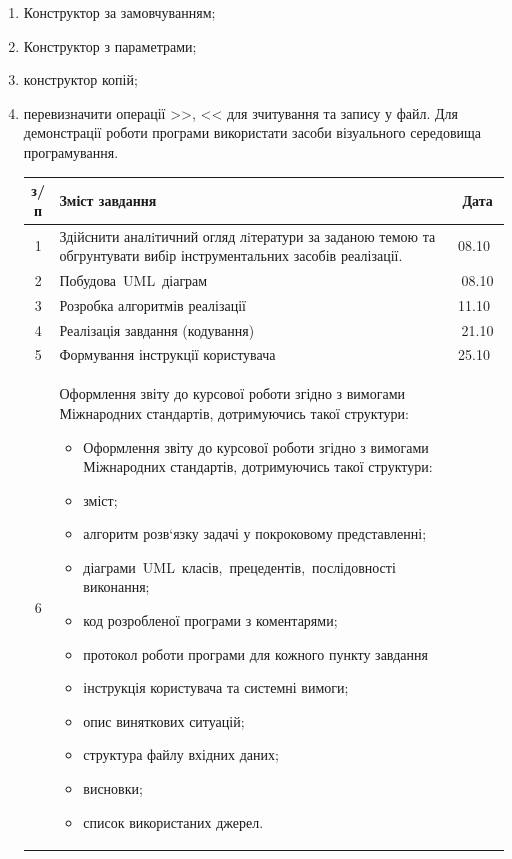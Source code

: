 \documentclass[14pt]{extarticle}
\begin{document}
\begin{enumerate}
\item Конструктор за замовчуванням;
\item Конструктор з параметрами; 
\item конструктор копій; 
\item перевизначити операції >>, << для зчитування та запису у файл. Для демонстрації роботи програми використати засоби візуального середовища програмування.

\begin{center}
    \begin{tabular}{| c | p{13cm} | c | }
        \hline
        \textnumero{} з/п & Зміст завдання & Дата\\
        \hline
        1 &
Здійснити аналiтичний огляд лiтератури за заданою темою та обгрунтувати вибір інструментальних засобів реалізації.
&
08.10 \\
        \hline
2 &
Побудова UML діаграм &
08.10\\
        \hline
        3 &
Розробка алгоритмів реалізації &
11.10 \\

        \hline
        4 &
Реалізація завдання (кодування) &
21.10\\

        \hline
        5 &
Формування інструкції користувача &
25.10 \\

        \hline

6 &

Оформлення звіту до курсової роботи згідно з вимогами Міжнародних стандартів, дотримуючись такої структури:

% 						        
%
\begin{itemize}
    
\item Оформлення звіту до курсової роботи згідно з вимогами Міжнародних стандартів, дотримуючись такої структури:
\item зміст;
\item алгоритм розв‘язку задачі у покроковому представленні;
\item діаграми UML класів, прецедентів, послідовності виконання;
\item код розробленої програми з коментарями;
\item протокол роботи програми для кожного пункту завдання
\item інструкція користувача та системні вимоги;
\item опис виняткових ситуацій;
\item структура файлу вхідних даних;
\item висновки;
\item список використаних джерел.


\end{itemize}
\end{tabular}
\end{center}
\end{enumerate}
\end{document}
